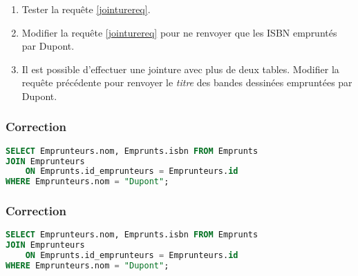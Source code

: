 \documentclass[svgnames,11pt]{beamer}
\begin{document}
\begin{frame}[fragile]
    \frametitle{}

\begin{activite}
\begin{enumerate}
\item Tester la requête \ref{jointurereq}.
\item Modifier la requête \ref{jointurereq} pour ne renvoyer que les ISBN empruntés par Dupont.
\item Il est possible d'effectuer une jointure avec plus de deux tables. Modifier la requête précédente pour renvoyer le \emph{titre} des bandes dessinées empruntées par Dupont.
\end{enumerate}
\end{activite}

\end{frame}
\begin{frame}[fragile]
    \frametitle{Correction}
\begin{center}
\begin{lstlisting}[language=SQL , basicstyle=\ttfamily\small, xleftmargin=1em, xrightmargin=0em]
SELECT Emprunteurs.nom, Emprunts.isbn FROM Emprunts
JOIN Emprunteurs 
    ON Emprunts.id_emprunteurs = Emprunteurs.id
WHERE Emprunteurs.nom = "Dupont";
\end{lstlisting}
\end{center}

\end{frame}
\begin{frame}[fragile]
    \frametitle{Correction}
\begin{center}
\begin{lstlisting}[language=SQL , basicstyle=\ttfamily\small, xleftmargin=1em, xrightmargin=0em]
SELECT Emprunteurs.nom, Emprunts.isbn FROM Emprunts
JOIN Emprunteurs 
    ON Emprunts.id_emprunteurs = Emprunteurs.id
WHERE Emprunteurs.nom = "Dupont";
\end{lstlisting}
\end{center}

\end{frame}
\end{document}
